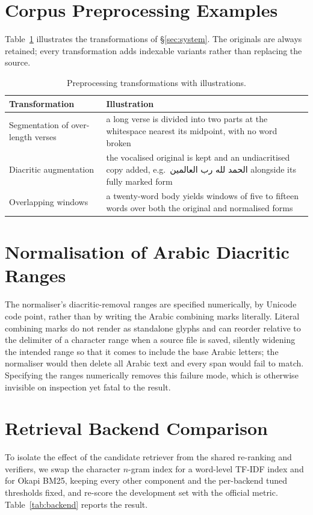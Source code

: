\documentclass[11pt]{article}
\newcommand{\ar}[1]{\foreignlanguage{arabic}{#1}}
\begin{document}
\section{Corpus Preprocessing Examples}
\label{app:preproc}
Table~\ref{tab:preproc} illustrates the transformations of \S\ref{sec:system}. The originals are
always retained; every transformation adds indexable variants rather than replacing the source.

\begin{table}[h]
\centering\small
\setlength{\tabcolsep}{4pt}
\begin{tabular}{@{}p{2.3cm}p{4.9cm}@{}}
\toprule
\textbf{Transformation} & \textbf{Illustration} \\
\midrule
Segmentation of over-length verses & a long verse is divided into two parts at the whitespace nearest its midpoint, with no word broken \\
\addlinespace[2pt]
Diacritic augmentation & the vocalised original is kept and an undiacritised copy added, e.g.\ \ar{الحمد لله رب العالمين} alongside its fully marked form \\
\addlinespace[2pt]
Overlapping windows & a twenty-word body yields windows of five to fifteen words over both the original and normalised forms \\
\bottomrule
\end{tabular}
\caption{Preprocessing transformations with illustrations.}
\label{tab:preproc}
\end{table}

\section{Normalisation of Arabic Diacritic Ranges}
\label{app:pitfall}
The normaliser's diacritic-removal ranges are specified numerically, by Unicode code point, rather
than by writing the Arabic combining marks literally. Literal combining marks do not render as
standalone glyphs and can reorder relative to the delimiter of a character range when a source file is
saved, silently widening the intended range so that it comes to include the base Arabic letters; the
normaliser would then delete all Arabic text and every span would fail to match. Specifying the ranges
numerically removes this failure mode, which is otherwise invisible on inspection yet fatal to the
result.

\section{Retrieval Backend Comparison}
\label{app:backend}
To isolate the effect of the candidate retriever from the shared re-ranking and verifiers, we swap
the character $n$-gram index for a word-level TF-IDF index and for Okapi BM25, keeping every other
component and the per-backend tuned thresholds fixed, and re-score the development set with the
official metric. Table~\ref{tab:backend} reports the result.
\end{document}
